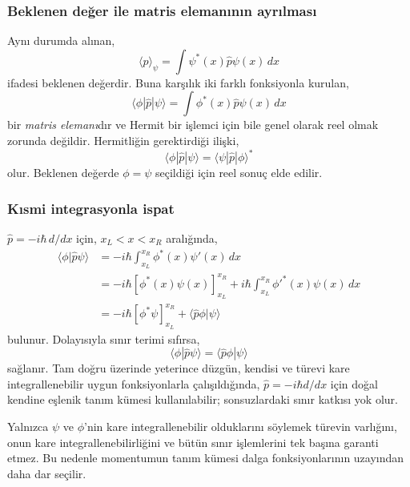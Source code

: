 \subsubsection*{Beklenen değer ile matris elemanının ayrılması}

Aynı durumda alınan,
\begin{equation}
 \langle p\rangle_\psi=\int\psi^*(x)\hat p\psi(x)\,dx
\end{equation}
ifadesi beklenen değerdir. Buna karşılık iki farklı fonksiyonla
kurulan,
\begin{equation}
 \langle\phi|\hat p|\psi\rangle
 =\int\phi^*(x)\hat p\psi(x)\,dx
\end{equation}
bir \emph{matris elemanı}dır ve Hermit bir işlemci için bile genel
olarak reel olmak zorunda değildir. Hermitliğin gerektirdiği ilişki,
\begin{equation}
 \langle\phi|\hat p|\psi\rangle
 =\langle\psi|\hat p|\phi\rangle^*
\end{equation}
olur. Beklenen değerde $\phi=\psi$ seçildiği için reel sonuç elde
edilir.

\subsubsection*{Kısmi integrasyonla ispat}

$\hat p=-i\hbar\,d/dx$ için, $x_L<x<x_R$ aralığında,
\begin{align}
 \langle\phi|\hat p\psi\rangle
 &=-i\hbar\int_{x_L}^{x_R}\phi^*(x)\psi'(x)\,dx\\
 &=-i\hbar[\phi^*(x)\psi(x)]_{x_L}^{x_R}
   +i\hbar\int_{x_L}^{x_R}\phi'^*(x)\psi(x)\,dx\\
 &=-i\hbar[\phi^*\psi]_{x_L}^{x_R}
   +\langle\hat p\phi|\psi\rangle
 \label{eq:05_p_sinir_terimi}
\end{align}
bulunur. Dolayısıyla sınır terimi sıfırsa,
\begin{equation}
 \boxed{\langle\phi|\hat p\psi\rangle
       =\langle\hat p\phi|\psi\rangle}
 \label{eq:05_p_hermit_ic_carpim}
\end{equation}
sağlanır. Tam doğru üzerinde yeterince düzgün, kendisi ve türevi
kare integrallenebilir uygun fonksiyonlarla çalışıldığında,
$\hat p=-i\hbar d/dx$ için doğal kendine eşlenik tanım kümesi
kullanılabilir; sonsuzlardaki sınır katkısı yok olur.

Yalnızca $\psi$ ve $\phi$'nin kare integrallenebilir olduklarını
söylemek türevin varlığını, onun kare integrallenebilirliğini ve bütün
sınır işlemlerini tek başına garanti etmez. Bu nedenle momentumun
tanım kümesi dalga fonksiyonlarının uzayından daha dar seçilir.

